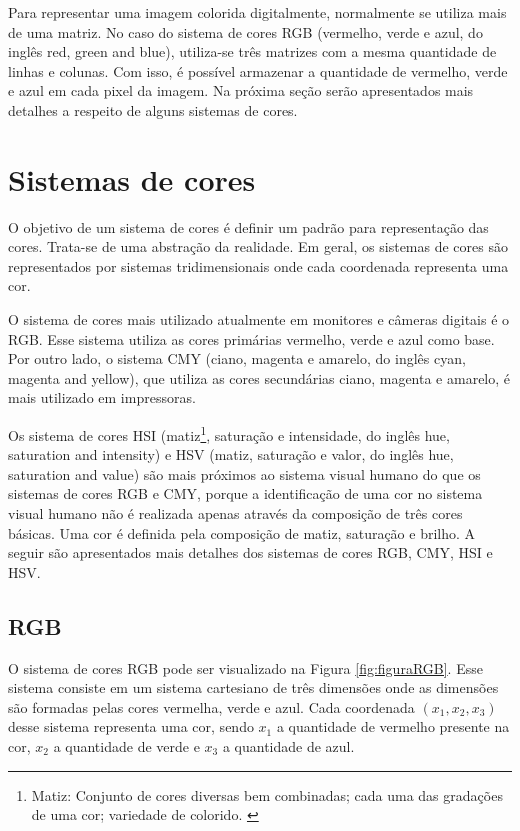 \documentclass[	12pt, Times, openright, twoside, a4paper, english, brazil]{abntex2}
\begin{document}
Para representar uma imagem colorida digitalmente, normalmente se utiliza mais de uma matriz. No caso do sistema de cores RGB (vermelho, verde e azul, do inglês red, green and blue), utiliza-se três matrizes com a mesma quantidade de linhas e colunas. Com isso, é possível armazenar a quantidade de vermelho, verde e azul em cada pixel da imagem. Na próxima seção serão apresentados mais detalhes a respeito de alguns sistemas de cores.

\section{Sistemas de cores}

O objetivo de um sistema de cores é definir um padrão para representação das cores. Trata-se de uma abstração da realidade. Em geral, os sistemas de cores são representados por sistemas tridimensionais onde cada coordenada representa uma cor.

O sistema de cores mais utilizado atualmente em monitores e câmeras digitais é o RGB. Esse sistema utiliza as cores primárias vermelho, verde e azul como base. Por outro lado, o sistema CMY (ciano, magenta e amarelo, do inglês cyan, magenta and yellow), que utiliza as cores secundárias ciano, magenta e amarelo, é mais utilizado em impressoras. 

Os sistema de cores HSI (matiz\footnote{Matiz: Conjunto de cores diversas bem combinadas; cada uma das gradações de uma cor; variedade de colorido. \cite{aurelioonline}}, saturação e intensidade, do inglês hue, saturation and intensity) e HSV (matiz, saturação e valor, do inglês hue, saturation and value) são mais próximos ao sistema visual humano do que os sistemas de cores RGB e CMY, porque a identificação de uma cor no sistema visual humano não é realizada apenas através da composição de três cores básicas. Uma cor é definida pela composição de matiz, saturação e brilho. A seguir são apresentados mais detalhes dos sistemas de cores RGB, CMY, HSI e HSV.

\subsection{RGB}

O sistema de cores RGB pode ser visualizado na Figura \ref{fig:figuraRGB}. Esse sistema consiste em um sistema cartesiano de três dimensões onde as dimensões são formadas pelas cores vermelha, verde e azul. Cada coordenada $(x_1, x_2, x_3)$ desse sistema representa uma cor, sendo $x_1$ a quantidade de vermelho presente na cor, $x_2$ a quantidade de verde e $x_3$ a quantidade de azul.
\end{document}
